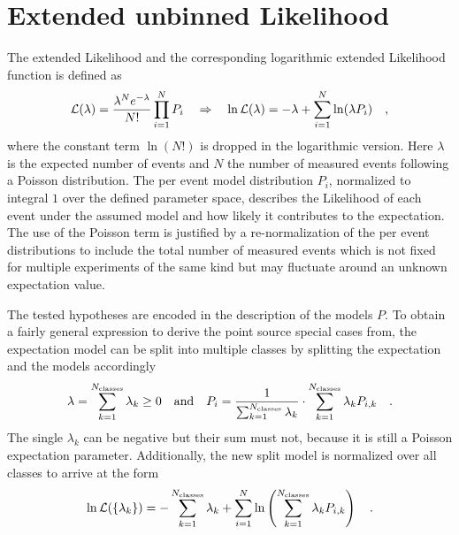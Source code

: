 \section{Extended unbinned Likelihood}
The extended Likelihood  and the corresponding logarithmic extended Likelihood function is defined as
\begin{equation}
  \mathcal{L}(\lambda) = \frac{\lambda^N e^{-\lambda}}{N!}\prod_{i=1}^N P_i
  \quad\Rightarrow\quad
    \ln\mathcal{L}(\lambda) = -\lambda+\sum_{i=1}^N \ln(\lambda P_i)
  \quad\text{,}
\end{equation}
where the constant term $\ln(N!)$ is dropped in the logarithmic version.
Here $\lambda$ is the expected number of events and $N$ the number of measured events following a Poisson distribution.
The per event model distribution $P_i$, normalized to integral $1$ over the defined parameter space, describes the Likelihood of each event under the assumed model and how likely it contributes to the expectation.
The use of the Poisson term is justified by a re-normalization of the per event distributions to include the total number of measured events which is not fixed for multiple experiments of the same kind but may fluctuate around an unknown expectation value.

The tested hypotheses are encoded in the description of the models $P$.
To obtain a fairly general expression to derive the point source special cases from, the expectation model can be split into multiple classes by splitting the expectation and the models accordingly
\begin{equation}
  \lambda = \sum_{k=1}^{N_\text{classes}} \lambda_k \geq 0
  \quad\text{and}\quad
  P_i = \frac{1}{\sum_{k=1}^{N_\text{classes}} \lambda_k}\cdot
         \sum_{k=1}^{N_\text{classes}} \lambda_k P_{i,k}
  \quad\text{.}
\end{equation}
The single $\lambda_k$ can be negative but their sum must not, because it is still a Poisson expectation parameter.
Additionally, the new split model is normalized over all classes to arrive at the form
\begin{equation}
  \ln\mathcal{L}(\{\lambda_k\})
  = -\sum_{k=1}^{N_\text{classes}} \lambda_k +
    \sum_{i=1}^N \ln\left(\sum_{k=1}^{N_\text{classes}}
      \lambda_k P_{i,k} \right)
  \quad\text{.}
\end{equation}

